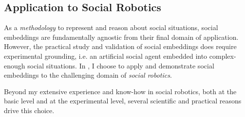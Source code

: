 

%
%

\subsection{Application to Social Robotics}

As a \emph{methodology} to represent and reason about social situations, social
embeddings are fundamentally agnostic from their final domain of application.
However, the practical study and validation of social embeddings does require
experimental grounding, i.e. an artificial social agent embedded into
complex-enough social situations. In \project, I choose to apply and demonstrate
social embeddings to the challenging domain of \emph{social robotics}.

Beyond my extensive experience and know-how in social robotics, both at the
basic level and at the experimental level, several scientific and practical
reasons drive this choice.

